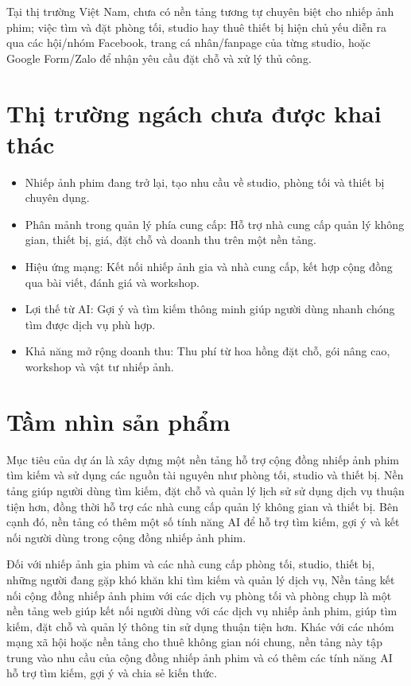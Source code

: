 Tại thị trường Việt Nam, chưa có nền tảng tương tự chuyên biệt cho nhiếp ảnh phim; việc tìm và đặt phòng tối, studio hay thuê thiết bị hiện chủ yếu diễn ra qua các hội/nhóm Facebook, trang cá nhân/fanpage của từng studio, hoặc Google Form/Zalo để nhận yêu cầu đặt chỗ và xử lý thủ công.

\section{Thị trường ngách chưa được khai thác}
 

\begin{itemize}
	\item Nhiếp ảnh phim đang trở lại, tạo nhu cầu về studio, phòng tối và thiết bị chuyên dụng.
	\item Phân mảnh trong quản lý phía cung cấp: Hỗ trợ nhà cung cấp quản lý không gian, thiết bị, giá, đặt chỗ và doanh thu trên một nền tảng.
	\item Hiệu ứng mạng: Kết nối nhiếp ảnh gia và nhà cung cấp, kết hợp cộng đồng qua bài viết, đánh giá và workshop.
	\item Lợi thế từ AI: Gợi ý và tìm kiếm thông minh giúp người dùng nhanh chóng tìm được dịch vụ phù hợp.
	\item Khả năng mở rộng doanh thu: Thu phí từ hoa hồng đặt chỗ, gói nâng cao, workshop và vật tư nhiếp ảnh.
\end{itemize}


\section{Tầm nhìn sản phẩm}

Mục tiêu của dự án là xây dựng một nền tảng hỗ trợ cộng đồng nhiếp ảnh phim tìm kiếm và sử dụng các nguồn tài nguyên như phòng tối, studio và thiết bị. Nền tảng giúp người dùng tìm kiếm, đặt chỗ và quản lý lịch sử sử dụng dịch vụ thuận tiện hơn, đồng thời hỗ trợ các nhà cung cấp quản lý không gian và thiết bị. Bên cạnh đó, nền tảng có thêm một số tính năng AI để hỗ trợ tìm kiếm, gợi ý và kết nối người dùng trong cộng đồng nhiếp ảnh phim.

Đối với nhiếp ảnh gia phim và các nhà cung cấp phòng tối, studio, thiết bị, những người đang gặp khó khăn khi tìm kiếm và quản lý dịch vụ, Nền tảng kết nối cộng đồng nhiếp ảnh phim với các dịch vụ phòng tối và phòng chụp là một nền tảng web giúp kết nối người dùng với các dịch vụ nhiếp ảnh phim, giúp tìm kiếm, đặt chỗ và quản lý thông tin sử dụng thuận tiện hơn. Khác với các nhóm mạng xã hội hoặc nền tảng cho thuê không gian nói chung, nền tảng này tập trung vào nhu cầu của cộng đồng nhiếp ảnh phim và có thêm các tính năng AI hỗ trợ tìm kiếm, gợi ý và chia sẻ kiến thức.

